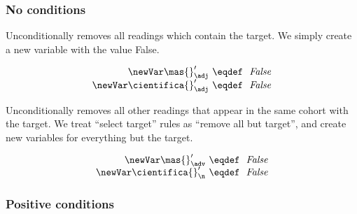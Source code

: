 \subsubsection{No conditions} 


 Unconditionally removes all readings which contain the target. We simply create a new variable with the value False.

\begin{equation}
\centering
%
\begin{array}{r @{~\eqdef~} l}
    \newVar \mas{}'_\adj         & \text{ \em False} \\
    \newVar \cientifica{}'_\adj  & \text{ \em False} \\
  \end{array}
\end{equation}

 Unconditionally removes all other readings that appear in the same cohort with the target. 
We treat ``{\sc select} target'' rules as ``{\sc remove} all but target'', and create new variables for everything but the target. 

\begin{equation}
\begin{array}{r @{~\eqdef~} l}
    \newVar \mas{}'_\adv      & \text{ \em False} \\
    \newVar \cientifica{}'_\n & \text{ \em False} \\
\end{array}
\label{eq:slAdjOrdered}
\end{equation}



\subsubsection{Positive conditions}

\def\invConds{\text{invalid condition}}
\def\onlyTrgLeft{\text{only target left}}

